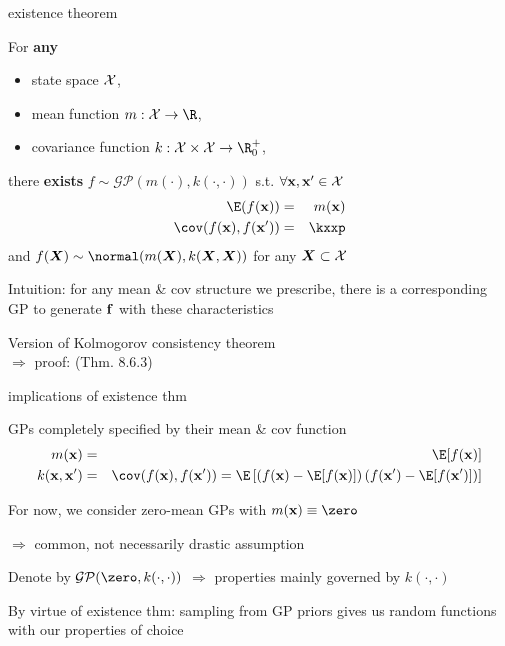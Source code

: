 \documentclass[11pt,compress,t,notes=noshow, xcolor=table]{beamer}
\begin{document}
\begin{framei}[sep=L]{existence theorem}
\item For \textbf{any} 
\begin{itemize}
\item state space $\mathcal{X}$,
\item mean function $m: \Xspace \rightarrow \R$,
\item covariance function $k: \Xspace \times \Xspace \rightarrow \R^+_0$, 
\end{itemize}
\vfill
there \textbf{exists} $f \sim \mathcal{GP}(m(\cdot), k(\cdot, \cdot))$ s.t. $\forall \mathbf{x}, \mathbf{x}^\prime \in \mathcal{X}$
\begin{eqnarray*}
\E(\fx) &=& m(\xv) \\
\cov(\fx, f(\xv^\prime)) &=& \kxxp
\end{eqnarray*}
and $f(\bm{X}) \sim \normal(m(\bm{X}), k(\bm{X}, \bm{X}))$ for any $\bm{X} \subset \mathcal{X}$
\item Intuition: for any mean \& cov structure we prescribe, there is a corresponding GP to generate $\mathbf{f}$ with these characteristics
\item Version of Kolmogorov consistency theorem  \\
$\Rightarrow$ proof:  (Thm. 8.6.3)
\end{framei}

\begin{framei}[sep=L]{implications of existence thm}
\item GPs completely specified by their mean \& cov function
\begin{eqnarray*}
m(\xv) &=& \E[f(\xv)] \\
k(\xv, \xv^\prime) &=& \cov(\fx, f(\xv^\prime)) = \E \left[\left( f(\xv) - \E[f(\xv)] \right) \left( f(\xv^\prime) - \E[f(\xv^\prime)] \right) \right]
\end{eqnarray*}
\item For now, we consider zero-mean GPs with $m(\xv) \equiv \zero$ 

$\Rightarrow$ common, not necessarily drastic assumption 
\item Denote by $\mathcal{GP}(\zero, k(\cdot, \cdot))$ $\Rightarrow$ properties mainly governed by $k(\cdot, \cdot)$
\item By virtue of existence thm: sampling from GP priors gives us random functions with our properties of choice
\end{framei}
\end{document}
